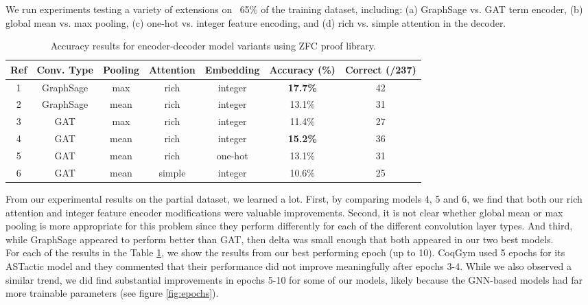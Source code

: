 \documentclass{article}
\begin{document}
We run experiments testing a variety of extensions on ~65\% of the training dataset, including: (a) GraphSage vs. GAT term encoder, (b) global mean vs. max pooling,  (c) one-hot vs. integer feature encoding, and (d) rich vs. simple attention in the decoder.
\begin{table}[h]
\begin{tabular}{ccccccc}
\hline
Ref & Conv. Type & Pooling & Attention & Embedding & Accuracy (\%) & Correct (/237) \\ \hline
1   & GraphSage  & max     & rich      & integer   & \textbf{17.7\% }       & 42     \\
2   & GraphSage  & mean    & rich      & integer   & 13.1\%        & 31             \\
3   & GAT        & max     & rich      & integer   & 11.4\%        & 27             \\
4   & GAT        & mean    & rich      & integer   & \textbf{15.2\%}        & 36      \\
5   & GAT        & mean    & rich      & one-hot   & 13.1\%          & 31             \\ 
6   & GAT        & mean    & simple   & integer   & 10.6\%        & 25             \\ \hline
\end{tabular}
\caption{Accuracy results for encoder-decoder model variants using ZFC proof library.}
\label{t1}
\end{table}

From our experimental results on the partial dataset, we learned a lot. First, by comparing models 4, 5 and 6, we find that both our rich attention and integer feature encoder modifications were valuable improvements. Second, it is not clear whether global mean or max pooling is more appropriate for this problem since they perform differently for each of the different convolution layer types. And third, while GraphSage appeared to perform better than GAT, then delta was small enough that both appeared in our two best models. \\

For each of the results in the Table \ref{t1}, we show the results from our best performing epoch (up to 10). CoqGym used 5 epochs for its ASTactic model and they commented that their performance did not improve meaningfully after epochs 3-4. While we also observed a similar trend, we did find substantial improvements in epochs 5-10 for some of our models, likely because the GNN-based models had far more trainable parameters (see figure \ref{fig:epochs}).
\end{document}
